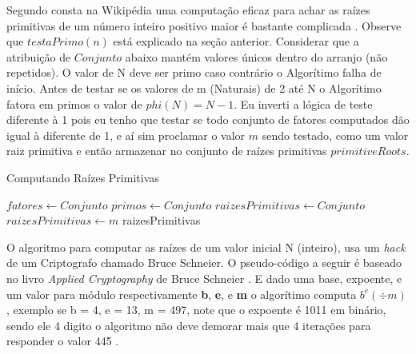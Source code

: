 \documentclass[conference]{IEEEtran}
\begin{document}
Segundo consta na Wikipédia \cite{primtest} uma computação eficaz para achar as
raízes primitivas de um número inteiro positivo maior é bastante complicada
\cite{robbins}\cite{vonzur}. Observe que $testaPrimo(n)$ está explicado na seção
anterior. Considerar que a atribuição de $Conjunto$ abaixo mantém valores únicos
dentro do arranjo (não repetidos). O valor de N deve ser primo caso contrário o
Algorítimo falha de início. Antes de testar se os valores de m (Naturais) de 2
até N o Algorítimo fatora em primos o valor de $phi(N) = N - 1$. Eu inverti a
lógica de teste diferente à 1 pois eu tenho que testar se todo conjunto de
fatores computados dão igual à diferente de 1, e aí sim proclamar o valor $m$
sendo testado, como um valor raiz primitiva e então armazenar no conjunto de
raízes primitivas $primitiveRoots$.

\begin{algorithm}
  \caption{Computando Raízes Primitivas}\label{proots}
  \begin{algorithmic}
        \State {}
      \EndIf
      \State $fatores \gets Conjunto$
      \State $primos \gets Conjunto$
      \State $raizesPrimitivas\gets Conjunto$
        \EndIf
      \EndFor
          \EndIf
        \EndFor
          \State $raizesPrimitivas \gets m$
        \EndIf
      \EndFor
      \Return raizesPrimitivas
    \EndFunction
  \end{algorithmic}
\end{algorithm}

O algoritmo para computar as raízes de um valor inicial N (inteiro), usa um
\textit{hack} de um Criptografo chamado Bruce Schneier. O pseudo-código a seguir
é baseado no livro \textit{Applied Cryptography} de Bruce Schneier
\cite{schneier}. E dado uma base, expoente, e um valor para módulo
respectivamente \textbf{b}, \textbf{e}, e \textbf{m} o algorítimo computa $b^e
(\div m)$, exemplo se b = 4, e = 13, m = 497, note que o expoente é 1011 em
binário, sendo ele 4 digito o algoritmo não deve demorar mais que 4 iterações
para responder o valor 445 \cite{powermod}. \\
\end{document}
